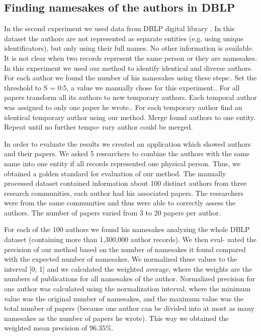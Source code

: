 \documentclass{llncs}
\newcommand\tab[1][0.5cm]{\hspace*{#1}}
\begin{document}
\subsection {Finding namesakes of the authors in DBLP}
In the second experiment we used data from DBLP digital library \cite{ley2002dblp}. In this
dataset the authors are not represented as separate entities (e.g. using unique
identificators), but only using their full names. No other information is available.
It is not clear when two records represent the same person or they are namesakes.
In this experiment we used our method to identify identical and diverse authors.\newline
\tab For each author we found the number of his namesakes using these steps:. Set the threshold to S = 0:5, a value we manually chose for this experiment.. For all papers transform all its authors to new temporary authors. Each
\tab temporal author was assigned to only one paper he wrote.. For each temporary author find an identical temporary author using our
\tab method. Merge found authors to one entity. Repeat until no further tempo-
\tab rary author could be merged.

In order to evaluate the results we created an application which showed
authors and their papers. We asked 5 researchers to combine the authors with
the same name into one entity if all records represented one physical person.
Thus, we obtained a golden standard for evaluation of our method. The manually
processed dataset contained information about 100 distinct authors from three
research communities, each author had his associated papers. The researchers
were from the same communities and thus were able to correctly assess the
authors. The number of papers varied from 3 to 20 papers per author.

For each of the 100 authors we found his namesakes analyzing the whole
DBLP dataset (containing more than 1,300,000 author records). We then eval-
uated the precision of our method based on the number of namesakes it found
compared with the expected number of namesakes. We normalized these values
to the interval [0, 1] and we calculated the weighted average, where the weights
are the numbers of publications for all namesakes of the author. Normalized
precision for one author was calculated using the normalization interval, where
the minimum value was the original number of namesakes, and the maximum
value was the total number of papers (because one author can be divided into
at most as many namesakes as the number of papers he wrote). This way we
obtained the weighted mean precision of 96.35\%.
\end{document}
